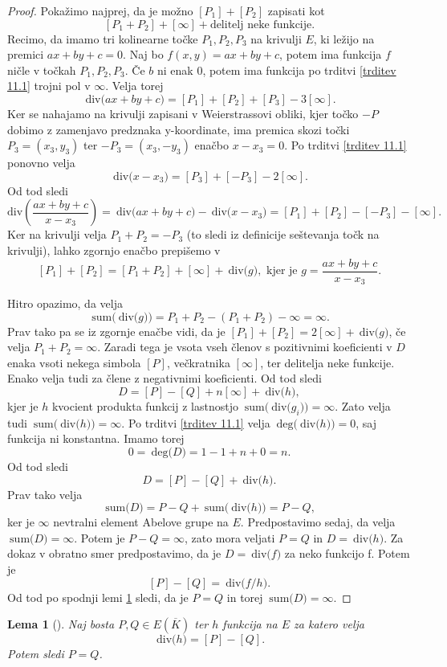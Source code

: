 \documentclass[12pt,a4paper,twoside]{article}
\theoremstyle{definition} %
\theoremstyle{plain} %
\newtheorem{lema}[definicija]{Lema}
\numberwithin{equation}{section}  %
\newcommand{\E}[1]{E({#1})}
\newcommand{\DEG}[1]{\ \text{deg(}{#1}\text{)}}
\newcommand{\Div}[1]{\ \text{div(}{#1}\text{)}}
\newcommand{\SUM}[1]{\ \text{sum(}{#1}\text{)}}
\begin{document}
\begin{proof}
Pokažimo najprej, da je možno $[P_1]+ [P_2]$ zapisati kot $$[P_1+P_2] + [\infty] + \text{delitelj neke funkcije}.$$
Recimo, da imamo tri kolinearne točke $P_1,P_2,P_3$ na krivulji $E$, ki ležijo na premici $ax+by+c = 0$.
Naj bo $f(x,y) = ax+by+c$, potem ima funkcija $f$ ničle v točkah $P_1,P_2,P_3$. Če $b$ ni enak $0$, potem ima funkcija po trditvi \ref{trditev 11.1} trojni pol v $\infty$.
Velja torej $$\Div{ax+by+c} = [P_1]+[P_2]+[P_3]-3[\infty].$$
Ker se nahajamo na krivulji zapisani v Weierstrassovi obliki, kjer točko $-P$ dobimo z zamenjavo predznaka y-koordinate, ima premica skozi točki $P_3 = (x_3,y_3)$ ter $-P_3=(x_3,-y_3)$ enačbo $x-x_3=0$.
Po  trditvi \ref{trditev 11.1} ponovno velja
$$\Div{x-x_3} = [P_3]+[-P_3]-2[\infty].$$
Od tod sledi
$$\text{div}\left( \frac{ax+by+c}{x-x_3}\right) = \Div{ax+by+c} - \Div{x-x_3} =[P_1]+[P_2]-[-P_3]-[\infty].$$
Ker na krivulji velja $P_1+P_2 = -P_3$ (to sledi iz definicije seštevanja točk na krivulji), lahko zgornjo enačbo prepišemo v 
$$[P_1]+[P_2] = [P_1+P_2]+[\infty]+\Div{g}, \text{ kjer je } g=\frac{ax+by+c}{x-x_3}.$$ 


Hitro opazimo, da velja
$$\SUM{\Div{g}}= P_1+P_2-(P_1+P_2)-\infty = \infty.$$
Prav tako pa se iz zgornje enačbe vidi, da je $[P_1]+[P_2] = 2[\infty] + \Div{g}$, če velja $P_1+P_2 = \infty$. Zaradi tega je vsota vseh členov s pozitivnimi koeficienti v $D$ enaka vsoti nekega simbola $[P]$, večkratnika $[\infty]$, ter delitelja neke funkcije. Enako velja tudi za člene z negativnimi koeficienti. Od tod sledi
$$D = [P]-[Q]+n[\infty]+\Div{h},$$
kjer je $h$ kvocient produkta funkcij z lastnostjo $\SUM{\Div{g_i}} = \infty$. Zato velja tudi
\newline $\SUM{\Div{h}}= \infty$. Po trditvi \ref{trditev 11.1} velja $\DEG{\Div{h}}=0$, saj funkcija ni konstantna. Imamo torej $$0 = \DEG{D} = 1-1+n+0=n.$$
Od tod sledi
$$D = [P]-[Q] + \Div{h}.$$
Prav tako velja
$$\SUM{D} = P-Q+\SUM{\Div{h}} = P-Q,$$
ker je $\infty$ nevtralni element Abelove grupe na $E$.
Predpostavimo sedaj, da velja $\SUM{D} = \infty$. Potem je $P-Q = \infty$, zato mora veljati $P=Q$ in $D = \Div{h}$. Za dokaz v obratno smer predpostavimo, da je $D = \Div{f}$ za neko funkcijo f. Potem je
$$[P]-[Q] = \Div{f/h}.$$
Od tod po spodnji lemi \ref{lema 11.3} sledi, da je $P = Q$ in torej $\SUM{D} = \infty$.

\end{proof}

\begin{lema}[]
\label{lema 11.3}
Naj bosta $P,Q \in \E{\overline{K}}$ ter $h$ funkcija na $E$ za katero velja
$$\Div{h}=[P]-[Q].$$
Potem sledi $P=Q$.
\end{lema}
\newpage
\end{document}
